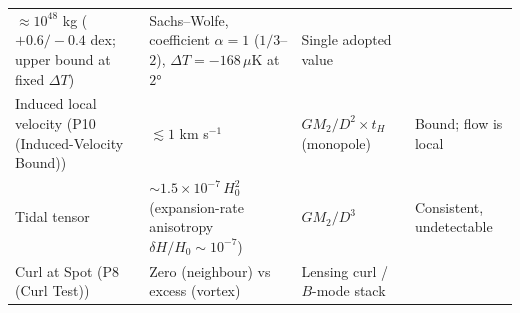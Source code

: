\documentclass[
]{article}
\begin{document}
\begin{longtable}[]{@{}llll@{}}
\begin{minipage}[t]{0.22\columnwidth}
\(\approx 10^{48}\) kg (\(+0.6/-0.4\) dex; upper bound at fixed
\(\Delta T\))\strut
\end{minipage} & \begin{minipage}[t]{0.22\columnwidth}\raggedright
Sachs--Wolfe, coefficient \(\alpha = 1\) (\(1/3\)--\(2\)),
\(\Delta T = -168\,\mu\)K at \(2°\)\strut
\end{minipage} & \begin{minipage}[t]{0.22\columnwidth}\raggedright
Single adopted value\strut
\end{minipage}\tabularnewline
\begin{minipage}[t]{0.22\columnwidth}\raggedright
Induced local velocity (P10 (Induced-Velocity Bound))\strut
\end{minipage} & \begin{minipage}[t]{0.22\columnwidth}\raggedright
\(\lesssim 1\) km s\(^{-1}\)\strut
\end{minipage} & \begin{minipage}[t]{0.22\columnwidth}\raggedright
\(GM_2/D^2 \times t_H\) (monopole)\strut
\end{minipage} & \begin{minipage}[t]{0.22\columnwidth}\raggedright
Bound; flow is local\strut
\end{minipage}\tabularnewline
\begin{minipage}[t]{0.22\columnwidth}\raggedright
Tidal tensor\strut
\end{minipage} & \begin{minipage}[t]{0.22\columnwidth}\raggedright
\(\sim\!1.5\times10^{-7}\,H_0^2\) (expansion-rate anisotropy
\(\delta H/H_0 \sim 10^{-7}\))\strut
\end{minipage} & \begin{minipage}[t]{0.22\columnwidth}\raggedright
\(GM_2/D^3\)\strut
\end{minipage} & \begin{minipage}[t]{0.22\columnwidth}\raggedright
Consistent, undetectable\strut
\end{minipage}\tabularnewline
\begin{minipage}[t]{0.22\columnwidth}\raggedright
Curl at Spot (P8 (Curl Test))\strut
\end{minipage} & \begin{minipage}[t]{0.22\columnwidth}\raggedright
Zero (neighbour) vs excess (vortex)\strut
\end{minipage} & \begin{minipage}[t]{0.22\columnwidth}\raggedright
Lensing curl / \(B\)-mode stack\strut

\end{minipage}
\end{longtable}
\end{document}
